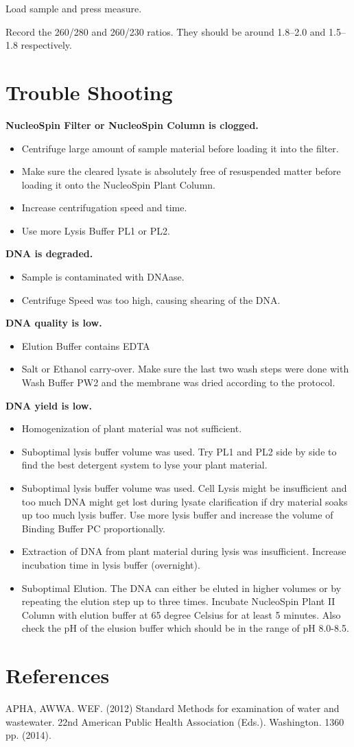 \documentclass[12pt]{../SOP3_beta}\usepackage[]{graphicx}\usepackage[]{xcolor}
\begin{document}
\NP Load sample and press measure.

\NP Record the 260/280 and 260/230 ratios. They should be around 1.8--2.0 and 1.5--1.8 respectively. 

\section{Trouble Shooting}

\NP \textbf{NucleoSpin Filter or NucleoSpin Column is clogged.}
\begin{itemize}
  \item Centrifuge large amount of sample material before loading it into the filter.
  \item Make sure the cleared lysate is absolutely free of resuspended matter before loading it onto the NucleoSpin Plant Column.
 \item Increase centrifugation speed and time.
 \item Use more Lysis Buffer PL1 or PL2.
\end{itemize}

\NP \textbf{DNA is degraded.}
\begin{itemize}
  \item Sample is contaminated with DNAase.
  \item Centrifuge Speed was too high, causing shearing of the DNA.
\end{itemize}

\NP \textbf{DNA quality is low.}
\begin{itemize}
  \item Elution Buffer contains EDTA
  \item Salt or Ethanol carry-over. Make sure the last two wash steps were done with Wash Buffer PW2 and the membrane was dried according to the protocol.
\end{itemize}

\NP \textbf{DNA yield is low.}
\begin{itemize}
  \item Homogenization of plant material was not sufficient. 
  \item Suboptimal lysis buffer volume was used. Try PL1 and PL2 side by side to find the best detergent system to lyse your plant material. 
  \item Suboptimal lysis buffer volume was used. Cell Lysis might be insufficient and too much DNA might get lost during lysate clarification if dry material soaks up too much lysis buffer. Use more lysis buffer and increase the volume of Binding Buffer PC proportionally.
  \item Extraction of DNA from plant material during lysis was insufficient. Increase incubation time in lysis buffer (overnight).
  \item Suboptimal Elution. The DNA can either be eluted in higher volumes or by repeating the elution step up to three times. Incubate NucleoSpin Plant II Column with elution buffer at 65 degree Celsius for at least 5 minutes.
Also check the pH of the elusion buffer which should be in the range of pH 8.0-8.5.
\end{itemize}

\section{References}

\NP APHA, AWWA. WEF. (2012) Standard Methods for examination of water and wastewater. 22nd American Public Health Association (Eds.). Washington. 1360 pp. (2014).
\end{document}

